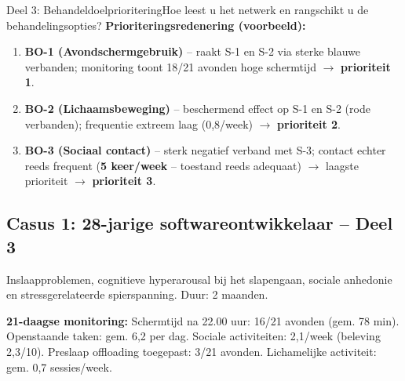 \documentclass[11pt,a4paper]{article}
\begin{document}
\begin{voorbeeldbox}{Deel 3: Behandeldoelprioritering}{Hoe leest u het netwerk en rangschikt u de behandelingsopties?}
\medskip
\textbf{Prioriteringsredenering (voorbeeld):}
\begin{enumerate}[topsep=2pt,itemsep=1pt,label=\arabic*.]
\item \textbf{BO-1 (Avondschermgebruik)} -- raakt S-1 en S-2 via sterke blauwe verbanden;
monitoring toont 18/21 avonden hoge schermtijd $\rightarrow$ \textbf{prioriteit 1}.
\item \textbf{BO-2 (Lichaamsbeweging)} -- beschermend effect op S-1 en S-2 (rode verbanden);
frequentie extreem laag (0,8/week) $\rightarrow$ \textbf{prioriteit 2}.
\item \textbf{BO-3 (Sociaal contact)} -- sterk negatief verband met S-3; contact echter reeds frequent (\textbf{5 keer/week} -- toestand reeds adequaat) $\rightarrow$ laagste prioriteit $\rightarrow$ \textbf{prioriteit 3}.
\end{enumerate}
\end{voorbeeldbox}

\vspace{0.5em}

\newpage
\subsection*{Casus 1: 28-jarige softwareontwikkelaar -- Deel 3}

\begin{complaintbox}[title={Casus 1: 28-jarige softwareontwikkelaar}]
\small Inslaapproblemen, cognitieve hyperarousal bij het slapengaan, sociale anhedonie en stressgerelateerde spierspanning. Duur: 2 maanden.
\end{complaintbox}

\begin{monitorbox}
\small\textbf{21-daagse monitoring:} Schermtijd na 22.00 uur: 16/21 avonden (gem. 78 min). Openstaande taken: gem. 6,2 per dag. Sociale activiteiten: 2,1/week (beleving 2,3/10). Preslaap offloading toegepast: 3/21 avonden. Lichamelijke activiteit: gem. 0,7 sessies/week.
\end{monitorbox}
\end{document}
